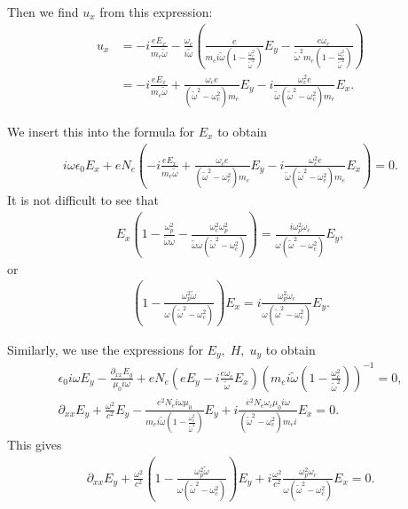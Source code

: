 \documentclass[a4paper,10pt]{article}
\begin{document}
Then we find $u_x$ from this expression:
\begin{align*}
 u_x&=-i\frac{e E_x}{m_e \tilde{\omega}}-\frac{\omega_c}{i\tilde{\omega}}
 \left(\frac{e}{m_e i\tilde{\omega}\left(1-\frac{\omega_c^2}{\tilde{\omega}^2}\right)}E_y-
 \frac{e\omega_c}{\tilde{\omega}^2 m_e \left(1-\frac{\omega_c^2}{\tilde{\omega}^2}\right)}\right)\\
 &=-i\frac{e E_x}{m_e\tilde{\omega}}+\frac{\omega_c e}{(\tilde{\omega}^2-\omega^2_c)m_e}E_y-i\frac{\omega_c^2 e}{\tilde{\omega}(\tilde{\omega}^2-\omega^2_c)m_e}E_x.
\end{align*}

We insert this into the formula for $E_x$ to obtain
\begin{align*}
 i\omega \epsilon_0 E_x+eN_e 
 \left(-i\frac{e E_x}{m_e\tilde{\omega}}
 +\frac{\omega_c e}{(\tilde{\omega}^2-\omega^2_c)m_e}E_y-
 i\frac{\omega_c^2 e}{\tilde{\omega}(\tilde{\omega}^2-\omega^2_c)m_e}E_x\right)=0.
\end{align*}
It is not difficult to see that 
\begin{align*} 
E_x\left(1-\frac{\omega_p^2}{\tilde{\omega}\omega}-\frac{\omega_c^2\omega_p^2}{\tilde{\omega}{\omega}(\tilde{\omega}^2-\omega_c^2)}\right)
=\frac{i\omega_p^2\omega_c}{\omega(\tilde{\omega}^2-\omega_c^2)}E_y,
\end{align*}
or
\begin{align*}
 (1-\frac{\omega_p^2\tilde{\omega}}{\omega(\tilde{\omega}^2-\omega_c^2)})E_x=i\frac{\omega_p^2\omega_c}{\omega(\tilde{\omega}^2-\omega^2_c)}E_y.
\end{align*}

Similarly, we use the expressions for $E_y,\; H, \; u_y$ to obtain 
\begin{align*}
 \epsilon_0 i\omega E_y-\frac{\partial_{xx}E_y}{\mu_0i\omega}+
 eN_e\left(eE_y-i\frac{e\omega_c}{\tilde{\omega}} E_x\right)\left(m_e i\tilde{\omega}\left(1-\frac{\omega_c^2}{\tilde{\omega}^2}\right)\right)^{-1}=0,\\
 \partial_{xx} E_{y}+\frac{\omega^2}{c^2}E_y-
 \frac{e^2N_ei\omega \mu_0}{m_e i\tilde{\omega}\left(1-\frac{\omega_c^2}{\tilde{\omega}^2}\right)}E_y+i\frac{e^2 N_e\omega_c\mu_0 i\omega}{(\tilde{\omega}^2-\omega_c^2)m_e i}E_x=0.
\end{align*}
This gives 
\begin{align*}
  \partial_{xx} E_{y}+\frac{\omega^2}{c^2}\left(1-\frac{\omega_p^2\tilde{\omega}}{\omega (\tilde{\omega}^2-\omega_c^2)}\right)E_y+
  i\frac{\omega^2}{c^2}\frac{\omega_p^2\omega_c}{\omega(\tilde{\omega}^2-\omega^2_c)}E_x=0.
\end{align*}
\end{document}

